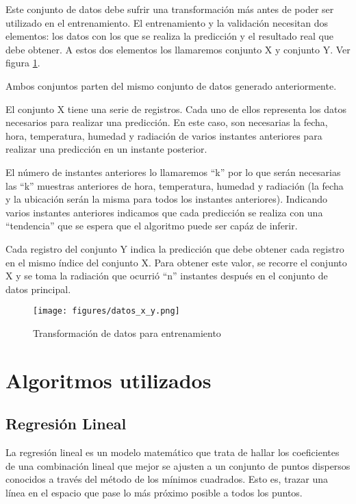 Este conjunto de datos debe sufrir una transformación más antes de poder ser utilizado en el entrenamiento. El entrenamiento y la validación necesitan dos elementos: los datos con los que se realiza la predicción y el resultado real que debe obtener. A estos dos elementos los llamaremos conjunto X y conjunto Y. Ver figura \ref{x_y}.

Ambos conjuntos parten del mismo conjunto de datos generado anteriormente.

El conjunto X tiene una serie de registros. Cada uno de ellos representa los datos necesarios para realizar una predicción. En este caso, son necesarias la fecha, hora, temperatura, humedad y radiación de varios instantes anteriores para realizar una predicción en un instante posterior.

El número de instantes anteriores lo llamaremos ``k'' por lo que serán necesarias las ``k'' muestras anteriores de hora, temperatura, humedad y radiación (la fecha y la ubicación serán la misma para todos los instantes anteriores). Indicando varios instantes anteriores indicamos que cada predicción se realiza con una ``tendencia'' que se espera que el algoritmo puede ser capáz de inferir.

Cada registro del conjunto Y indica la predicción que debe obtener cada registro en el mismo índice del conjunto X. Para obtener este valor, se recorre el conjunto X y se toma la radiación que ocurrió ``n'' instantes después en el conjunto de datos principal.

\begin{figure}[htb]
	\begin{center}
		\texttt{[image: figures/datos\_x\_y.png]}
		\caption{Transformación de datos para entrenamiento \label{x_y}}
	\end{center}
\end{figure}

\section{Algoritmos utilizados}
\label{makereference4.3}
	\subsection{Regresión Lineal}
	\label{makereference4.3.1}

	La regresión lineal es un modelo matemático que trata de hallar los coeficientes de una combinación lineal que mejor se ajusten a un conjunto de puntos dispersos conocidos a través del método de los mínimos cuadrados. Esto es, trazar una línea en el espacio que pase lo más próximo posible a todos los puntos.

